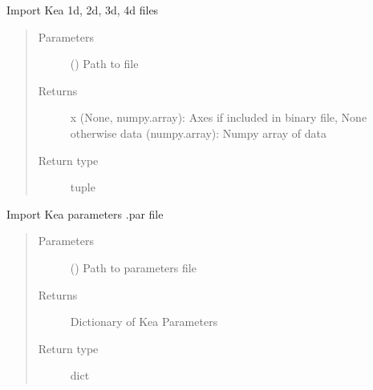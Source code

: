 \documentclass[letterpaper,10pt,english]{sphinxmanual}
\begin{document}

\begin{fulllineitems}
\label{\detokenize{dnpImport:dnpLab.dnpImport.prospa.import_nd}}
Import Kea 1d, 2d, 3d, 4d files
\begin{quote}\begin{description}
\item[{Parameters}] \leavevmode
{} () \sphinxhyphen{}\sphinxhyphen{} Path to file

\item[{Returns}] \leavevmode
x (None, numpy.array): Axes if included in binary file, None otherwise
data (numpy.array): Numpy array of data

\item[{Return type}] \leavevmode
tuple

\end{description}\end{quote}

\end{fulllineitems}


\begin{fulllineitems}
\label{\detokenize{dnpImport:dnpLab.dnpImport.prospa.import_par}}
Import Kea parameters .par file
\begin{quote}\begin{description}
\item[{Parameters}] \leavevmode
{} () \sphinxhyphen{}\sphinxhyphen{} Path to parameters file

\item[{Returns}] \leavevmode
Dictionary of Kea Parameters

\item[{Return type}] \leavevmode
dict

\end{description}\end{quote}

\end{fulllineitems}
\end{document}
